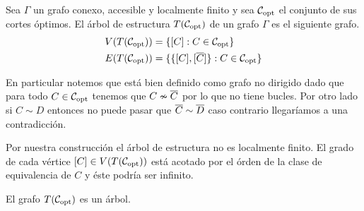 \documentclass[tesis.tex]{subfiles}
\begin{document}
\begin{deff}
	Sea $\Gamma$ un grafo conexo, accesible y localmente finito y sea ${\cal C}_{\text{opt}}$ el conjunto de sus cortes óptimos.
	El árbol de estructura $T({\cal C}_{\text{opt}})$ de un grafo $\Gamma$ es el siguiente grafo.
	\begin{align*}
		V(T({\cal C}_{\text{opt}})) &= \{ [C] : C \in {\cal C}_{\text{opt}} \} \\
		E(T({\cal C}_{\text{opt}})) &= \{ \{ [C], [\overline C] \} : C \in {\cal C}_{\text{opt}}   \}
	\end{align*}
\end{deff}

En particular notemos que está bien definido como grafo no dirigido dado que para todo $C \in {\cal C}_{\text{opt}}$ tenemos que $C \nsim \overline C$ por lo que no tiene bucles.
Por otro lado si $C \sim D$ entonces no puede pasar que $\overline C \sim \overline D$ caso contrario llegaríamos a una contradicción.

Por nuestra construcción el árbol de estructura no es localmente finito.
El grado de cada vértice $[C] \in V(T({\cal C}_{\text{opt}}))$ está acotado por el órden de la clase de equivalencia de $C$ y éste podría ser infinito.

\begin{prop}
	El grafo $T({\cal C}_{\text{opt}})$ es un árbol.
\end{prop}
\end{document}
